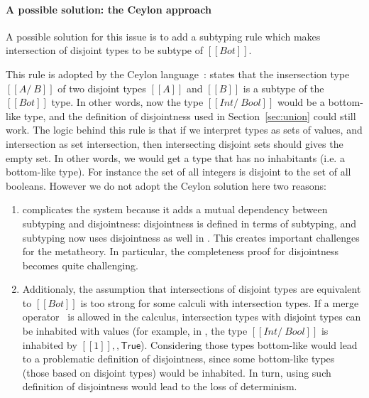 \paragraph{A possible solution: the Ceylon approach}
A possible solution for this issue is to add a subtyping rule which makes intersection of
disjoint types to be subtype of $[[Bot]]$.

\begin{center}
\end{center}

\noindent This rule is adopted by the Ceylon language~\cite{muehlboeck2018empowering}:
 states that the insersection type $[[A /\ B]]$
of two disjoint types $[[A]]$ and $[[B]]$ is a subtype of the $[[Bot]]$ type.
In other words, now the type $[[Int /\ Bool]]$ would be a bottom-like type, and the
definition of disjointness used in Section~\ref{sec:union} could still work.
The logic behind this rule is that if we interpret types as sets of values,
and intersection as set intersection, then intersecting disjoint sets should
gives the empty set. In other words, we would get a type that has no inhabitants (i.e.
a bottom-like type).
For instance the set of all integers is disjoint to the set of all booleans.
However we do not adopt the Ceylon solution here two reasons:

\begin{enumerate}

\item {} complicates the system because
  it adds a mutual dependency between subtyping and disjointness:
  disjointness is defined in terms of subtyping, and subtyping now
  uses disjointness as well in . This creates important
  challenges for the metatheory. In particular, the completeness proof
  for disjointness becomes quite challenging.

\item Additionaly, the assumption that intersections of disjoint types
  are equivalent to $[[Bot]]$ is too strong for some calculi with intersection
  types. If a merge operator~\cite{reynolds1988preliminary} is allowed in the calculus, 
  intersection types
  with disjoint types can be inhabited with values (for example, in 
  \cite{oliveira2016disjoint},
  the type $[[Int /\ Bool]]$ is inhabited by $[[1]] ,, \mathsf{True}$). Considering those
  types bottom-like would lead to a problematic definition of disjointness,
  since some bottom-like types (those based on disjoint types) would
  be inhabited. In turn, using such definition of disjointness would lead to
  the loss of determinism.

\end{enumerate}

